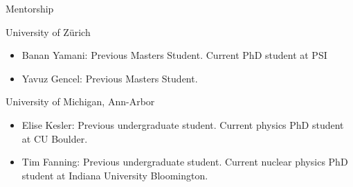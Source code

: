 \documentclass{resume} %
\begin{document}
\begin{rSection}{Mentorship}
\begin{rSubsection}{University of Zürich}{}{}{}
    \begin{itemize}
    \item Banan Yamani: Previous Masters Student. Current PhD student at \ac{PSI}
    \item Yavuz Gencel: Previous Masters Student. 
    \end{itemize}
\end{rSubsection}

\begin{rSubsection}{University of Michigan, Ann-Arbor}{}{}{}
\begin{itemize}
    \item Elise Kesler: Previous undergraduate student. Current physics PhD student at CU Boulder.
    \item Tim Fanning: Previous undergraduate student. Current nuclear physics PhD student at Indiana University Bloomington.
\end{itemize}
\end{rSubsection}

\end{rSection}





%

\end{document}

